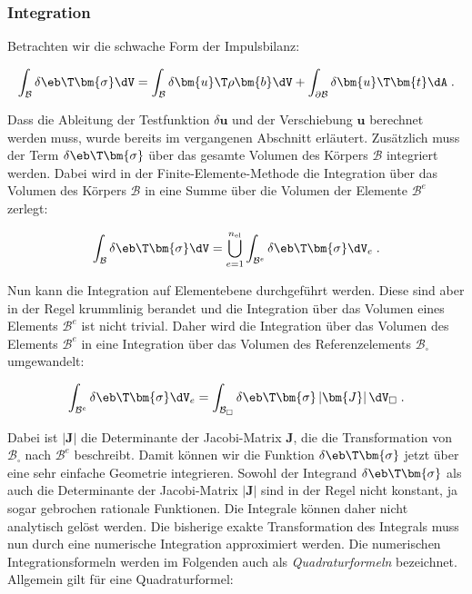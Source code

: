 \subsubsection{Integration}

Betrachten wir die schwache Form der Impulsbilanz:

\begin{equation}
\int_{\mathcal{B}} \delta\eb\T  \bm{\sigma} \dV = \int_{\mathcal{B}} \delta \bm{u}\T \rho \bm{b} \dV + \int_{\partial\mathcal{B}} \delta \bm{u}\T  \bm{t} \dA \; .
\end{equation}

Dass die Ableitung der Testfunktion $\delta \bm{u}$ und der Verschiebung $\bm{u}$ berechnet werden muss, wurde bereits im vergangenen Abschnitt erläutert. Zusätzlich muss der Term $\delta\eb\T  \bm{\sigma}$ über das gesamte Volumen des Körpers $\mathcal{B}$ integriert werden. Dabei wird in der Finite-Elemente-Methode die Integration über das Volumen des Körpers $\mathcal{B}$ in eine Summe über die Volumen der Elemente $\mathcal{B}^e$ zerlegt:

\begin{equation}
\int_{\mathcal{B}} \delta\eb\T  \bm{\sigma} \dV = \bigcup_{e=1}^{n_{\text{el}}} \int_{\mathcal{B}^e} \delta\eb\T  \bm{\sigma} \dV_e \; .
\end{equation}

Nun kann die Integration auf Elementebene durchgeführt werden. Diese sind aber in der Regel krummlinig berandet und die Integration über das Volumen eines Elements $\mathcal{B}^e$ ist nicht trivial. Daher wird die Integration über das Volumen des Elements $\mathcal{B}^e$ in eine Integration über das Volumen des Referenzelements $\mathcal{B}_{\square}$ umgewandelt:

\begin{equation}
\int_{\mathcal{B}^e} \delta\eb\T  \bm{\sigma} \dV_e = \int_{\mathcal{B}_{\square}} \delta\eb\T  \bm{\sigma} \left| \bm{J} \right| \dV_{\square} \; .
\end{equation}

Dabei ist $\left| \bm{J} \right|$ die Determinante der Jacobi-Matrix $\bm{J}$, die die Transformation von $\mathcal{B}_{\square}$ nach $\mathcal{B}^e$ beschreibt. Damit können wir die Funktion $\delta\eb\T  \bm{\sigma}$ jetzt über eine sehr einfache Geometrie integrieren. Sowohl der Integrand $\delta\eb\T  \bm{\sigma}$ als auch die Determinante der Jacobi-Matrix $\left| \bm{J} \right|$ sind in der Regel nicht konstant, ja sogar gebrochen rationale Funktionen. Die Integrale können daher nicht analytisch gelöst werden. Die bisherige exakte Transformation des Integrals muss nun durch eine numerische Integration approximiert werden. Die numerischen Integrationsformeln werden im Folgenden auch als \textit{Quadraturformeln} bezeichnet. Allgemein gilt für eine Quadraturformel:

